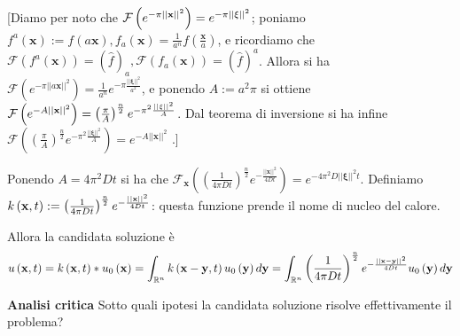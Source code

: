 \documentclass{article}
\begin{document}
[Diamo per noto che $\mathcal{F}\left( e^{-\pi \left\vert \left\vert \mathbf{%
x}\right\vert \right\vert ^{2}}\right) =e^{-\pi \left\vert \left\vert 
\mathbf{\xi }\right\vert \right\vert ^{2}}$; poniamo $f^{a}\left( \mathbf{x}%
\right) :=f\left( a\mathbf{x}\right) ,f_{a}\left( \mathbf{x}\right) =\frac{1%
}{a^{n}}f\left( \frac{\mathbf{x}}{a}\right) $, e ricordiamo che $\mathcal{F}%
\left( f^{a}\left( \mathbf{x}\right) \right) =\left( \hat{f}\right) _{a},%
\mathcal{F}\left( f_{a}\left( \mathbf{x}\right) \right) =\left( \hat{f}%
\right) ^{a}$. Allora si ha $\mathcal{F}\left( e^{-\pi \left\vert \left\vert
a\mathbf{x}\right\vert \right\vert ^{2}}\right) =\frac{1}{a^{n}}e^{-\pi 
\frac{\left\vert \left\vert \mathbf{\xi }\right\vert \right\vert ^{2}}{a^{2}}%
}$, e ponendo $A:=a^{2}\pi $ si ottiene $\mathcal{F}\left( e^{-A\left\vert
\left\vert \mathbf{x}\right\vert \right\vert ^{2}}\right) =\left( \frac{\pi 
}{A}\right) ^{\frac{n}{2}}e^{-\pi ^{2}\frac{\left\vert \left\vert \mathbf{%
\xi }\right\vert \right\vert ^{2}}{A}}$. Dal teorema di inversione si ha
infine $\mathcal{F}\left( \left( \frac{\pi }{A}\right) ^{\frac{n}{2}}e^{-\pi
^{2}\frac{\left\vert \left\vert \mathbf{\xi }\right\vert \right\vert ^{2}}{A}%
}\right) =e^{-A\left\vert \left\vert \mathbf{x}\right\vert \right\vert ^{2}}$%
.]

Ponendo $A=4\pi ^{2}Dt$ si ha che $\mathcal{F}_{\mathbf{x}}\left( \left( 
\frac{1}{4\pi Dt}\right) ^{\frac{n}{2}}e^{-\frac{\left\vert \left\vert 
\mathbf{x}\right\vert \right\vert ^{2}}{4Dt}}\right) =e^{-4\pi
^{2}D\left\vert \left\vert \mathbf{\xi }\right\vert \right\vert ^{2}t}$.
Definiamo $k\left( \mathbf{x},t\right) :=\left( \frac{1}{4\pi Dt}\right) ^{%
\frac{n}{2}}e^{-\frac{\left\vert \left\vert \mathbf{x}\right\vert
\right\vert ^{2}}{4Dt}}$: questa funzione prende il nome di nucleo del
calore.

Allora la candidata soluzione \`{e}%
\begin{equation*}
u\left( \mathbf{x},t\right) =k\left( \mathbf{x},t\right) \ast u_{0}\left( 
\mathbf{x}\right) =\int_{%
\mathbb{R}
^{n}}k\left( \mathbf{x-y},t\right) u_{0}\left( \mathbf{y}\right) d\mathbf{y}%
=\int_{%
\mathbb{R}
^{n}}\left( \frac{1}{4\pi Dt}\right) ^{\frac{n}{2}}e^{-\frac{\left\vert
\left\vert \mathbf{x-y}\right\vert \right\vert ^{2}}{4Dt}}u_{0}\left( 
\mathbf{y}\right) d\mathbf{y}
\end{equation*}

\textbf{Analisi critica} Sotto quali ipotesi la candidata soluzione risolve
effettivamente il problema?
\end{document}
